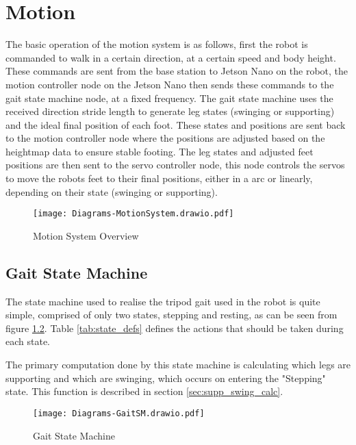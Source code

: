 \chapter{Motion} \label{chap:motion}
The basic operation of the motion system is as follows, first the robot is commanded to walk in a certain direction, at a
certain speed and body height. These commands are sent from the base station to Jetson Nano on the robot,
the motion controller node on the Jetson Nano then sends these commands to the gait state machine node, at a fixed frequency.
The gait state machine uses the received direction stride length to generate leg states (swinging or supporting) and the ideal
final position of each foot. These states and positions are sent back to the motion controller node where the positions are adjusted
based on the heightmap data to ensure stable footing. The leg states and adjusted feet positions are then sent to the servo 
controller node, this node controls the servos to move the robots feet to their final positions, either in a arc or linearly,
depending on their state (swinging or supporting). %

\begin{figure}[h]
    \centering
    \texttt{[image: Diagrams-MotionSystem.drawio.pdf]}
    \caption{Motion System Overview}
    \label{fig:motion_system}
\end{figure}

\section{Gait State Machine}
The state machine used to realise the tripod gait used in the robot is quite simple, comprised of only two states, stepping and
resting, as can be seen from figure \ref{fig:gaitSM}. Table \ref{tab:state_defs} defines the actions that should be taken during
each state.

The primary computation done by this state machine is calculating which legs are supporting and which are swinging, which occurs
on entering the "Stepping" state. This function is described in section \ref{sec:supp_swing_calc}.

\begin{figure}[h]
    \centering
    \texttt{[image: Diagrams-GaitSM.drawio.pdf]}
    \caption{Gait State Machine}
    \label{fig:gaitSM}
\end{figure}

